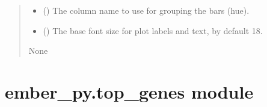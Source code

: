 \documentclass[letterpaper,10pt,english]{sphinxmanual}
\begin{document}
\begin{fulllineitems}
\begin{quote}
\begin{description}
\begin{itemize}
\item {} 
\sphinxAtStartPar
{} (\sphinxstyleliteralemphasis{\sphinxupquote{, }}) \textendash{} The column name to use for grouping the bars (hue).

\item {} 
\sphinxAtStartPar
{} (\sphinxstyleliteralemphasis{\sphinxupquote{, }}) \textendash{} The base font size for plot labels and text, by default 18.

\end{itemize}

\sphinxAtStartPar
None

\end{description}\end{quote}

\end{fulllineitems}



\section{ember\_py.top\_genes module}
\label{\detokenize{ember_py:module-ember_py.top_genes}}\label{\detokenize{ember_py:ember-py-top-genes-module}}
\end{document}
